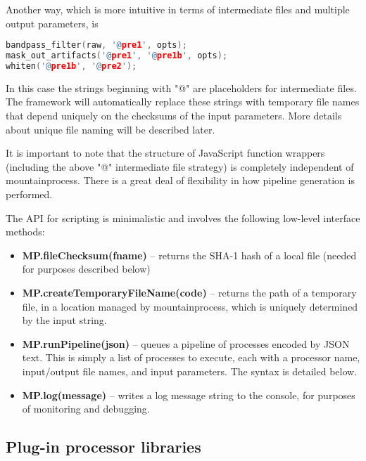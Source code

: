 \documentclass{article}
\begin{document}
Another way, which is more intuitive in terms of intermediate files and multiple output parameters, is
\begin{lstlisting}[language=C++]
bandpass_filter(raw, '@pre1', opts);
mask_out_artifacts('@pre1', '@pre1b', opts);
whiten('@pre1b', '@pre2');
\end{lstlisting}
In this case the strings beginning with "@" are placeholders for intermediate files. The framework will automatically replace these strings with temporary file names that depend uniquely on the checksums of the input parameters. More details about unique file naming will be described later.

It is important to note that the structure of JavaScript function wrappers (including the above "@" intermediate file strategy) is completely independent of mountainprocess. There is a great deal of flexibility in how pipeline generation is performed.

The API for scripting is minimalistic and involves the following low-level interface methods:
\begin{itemize}
\item{\textbf{MP.fileChecksum(fname)} -- returns the SHA-1 hash of a local file (needed for purposes described below)}
\item{\textbf{MP.createTemporaryFileName(code)} -- returns the path of a temporary file, in a location managed by mountainprocess, which is uniquely determined by the input string.}
\item{\textbf{MP.runPipeline(json)} -- queues a pipeline of processes encoded by JSON text. This is simply a list of processes to execute, each with a processor name, input/output file names, and input parameters. The syntax is detailed below.}
\item{\textbf{MP.log(message)} -- writes a log message string to the console, for purposes of monitoring and debugging.}

\end{itemize}

\subsection{Plug-in processor libraries}
\end{document}
